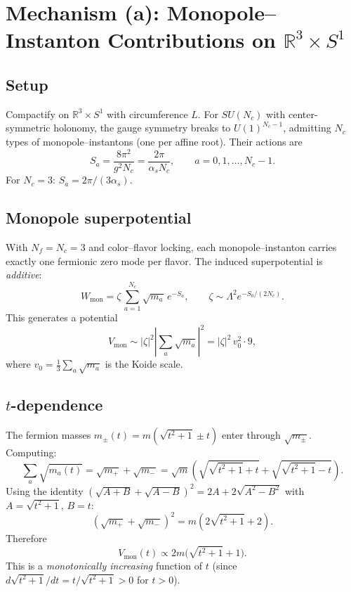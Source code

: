 \section{Mechanism (a): Monopole--Instanton Contributions on $\mathbb{R}^3 \times S^1$}

\subsection{Setup}

Compactify on $\mathbb{R}^3 \times S^1$ with circumference $L$.
For $SU(N_c)$ with center-symmetric holonomy,
the gauge symmetry breaks to $U(1)^{N_c - 1}$,
admitting $N_c$ types of monopole--instantons (one per affine root).
Their actions are
\begin{equation}
S_a = \frac{8\pi^2}{g^2 N_c} = \frac{2\pi}{\alpha_s N_c}, \qquad a = 0, 1, \ldots, N_c - 1.
\end{equation}
For $N_c = 3$: $S_a = 2\pi/(3\alpha_s)$.

\subsection{Monopole superpotential}

With $N_f = N_c = 3$ and color--flavor locking, each monopole--instanton
carries exactly one fermionic zero mode per flavor.
The induced superpotential is \emph{additive}:
\begin{equation}
W_{\text{mon}} = \zeta\,\sum_{a=1}^{N_c} \sqrt{m_a}\,e^{-S_a},
\qquad \zeta \sim \Lambda^2 e^{-S_0/(2N_c)}.
\end{equation}
This generates a potential
\begin{equation}
V_{\text{mon}} \sim |\zeta|^2 \left|\sum_a \sqrt{m_a}\right|^2
= |\zeta|^2\, v_0^2 \cdot 9,
\end{equation}
where $v_0 = \frac{1}{3}\sum_a \sqrt{m_a}$ is the Koide scale.

\subsection{$t$-dependence}

The fermion masses $m_\pm(t) = m(\sqrt{t^2+1} \pm t)$ enter through $\sqrt{m_\pm}$.
Computing:
\begin{equation}
\sum_a \sqrt{m_a(t)} = \sqrt{m_+} + \sqrt{m_-}
= \sqrt{m}\left(\sqrt{\sqrt{t^2+1}+t} + \sqrt{\sqrt{t^2+1}-t}\right).
\end{equation}
Using the identity $(\sqrt{A+B} + \sqrt{A-B})^2 = 2A + 2\sqrt{A^2 - B^2}$
with $A = \sqrt{t^2+1}$, $B = t$:
\begin{equation}
\left(\sqrt{m_+} + \sqrt{m_-}\right)^2 = m\left(2\sqrt{t^2+1} + 2\right).
\end{equation}
Therefore
\begin{equation}
V_{\text{mon}}(t) \propto 2m\bigl(\sqrt{t^2+1} + 1\bigr).
\end{equation}
This is a \emph{monotonically increasing} function of $t$ (since $d\sqrt{t^2+1}/dt = t/\sqrt{t^2+1} > 0$
for $t > 0$).

